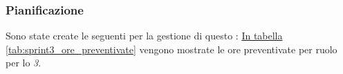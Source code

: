 \subsubsection{Pianificazione}
Sono state create le seguenti  per la gestione di questo : 
\hyperref[tab:sprint3_ore_preventivate]{In tabella \ref{tab:sprint3_ore_preventivate}} vengono mostrate le ore preventivate per ruolo per lo \textit{ 3}.

\begin{table}[H]
    \centering
    \caption{Ore preventivate per ruolo Sprint 3}
    \label{tab:sprint3_ore_preventivate}
\end{table}